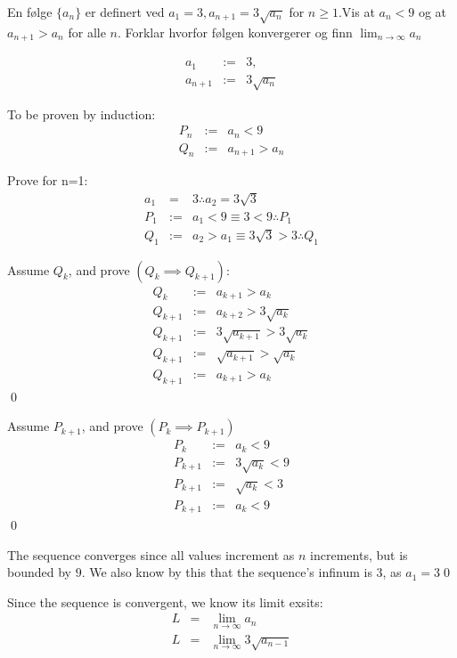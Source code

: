 \documentclass{myassignment}
\begin{document}
	\pagebreak
	\begin{problem}
		En følge $\{ a_n \}$ er definert ved $a_1 = 3, a_{n+1} = 3\sqrt{a_n}$ for $n \geq 1$.Vis at $a_n < 9$ og at $a_{n+1} > a_n$ for alle $n$. Forklar hvorfor følgen konvergerer og finn $\lim_{n \rightarrow \infty}{a_n}$
	\end{problem}
	\begin{answer}
		\begin{eqnarray}
		a_1 &:=& 3,\\
		a_{n+1} &:=& 3\sqrt{a_n}
		\end{eqnarray}

		To be proven by induction:
		\begin{eqnarray}
		P_n &:=& a_n < 9\\
		Q_n &:=& a_{n+1} > a_n
		\end{eqnarray}

		Prove for n=1:
		\begin{eqnarray}
			a_1 &=& 3 \therefore a_2 = 3\sqrt{3}\\
			P_1 &:=& a_1  < 9 \equiv 3 < 9 \therefore P_1\\
			Q_1 &:=& a_2 > a_1 \equiv 3\sqrt{3} > 3 \therefore Q_1
		\end{eqnarray}
		
		Assume $Q_{k}$, and prove $(Q_{k} \implies Q_{k+1})$:
		\begin{eqnarray}
			Q_{k} &:=& a_{k+1} > a_k \\
			Q_{k+1} &:=& a_{k+2} > 3\sqrt{a_k}\\
			Q_{k+1} &:=& 3\sqrt{a_{k+1}} > 3\sqrt{a_k}\\
			Q_{k+1} &:=& \sqrt{a_{k+1}} > \sqrt{a_k}\\
			Q_{k+1} &:=& a_{k+1} > a_k
		\end{eqnarray}
		\qed

		Assume $P_{k+1}$, and prove $(P_{k} \implies P_{k+1})$
		\begin{eqnarray}
			P_{k} &:=& a_{k} < 9\\
			P_{k+1} &:=& 3\sqrt{a_k} < 9\\
			P_{k+1} &:=& \sqrt{a_k} < 3\\
			P_{k+1} &:=& a_k < 9
		\end{eqnarray}
		\qed

		\pagebreak
		The sequence converges since all values increment as $n$ increments, but is bounded by $9$. We also know by this that the sequence's infinum is 3, as $a_1=3$\qed

		Since the sequence is convergent, we know its limit exsits:
		\begin{eqnarray}
			L &=& \lim_{n\rightarrow\infty} a_n\\[1em]
			L &=& \lim_{n\rightarrow\infty} 3\sqrt{a_{n-1}}
		\end{eqnarray}


\end{answer}
\end{document}
